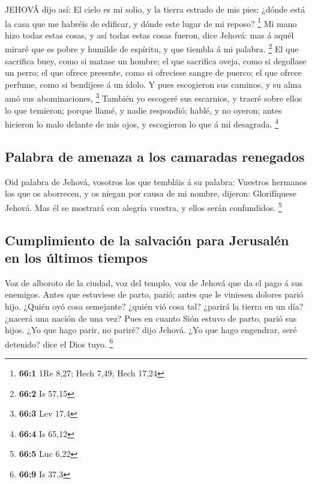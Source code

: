  JEHOVÁ dijo así: El cielo es mi solio, y la tierra estrado
de mis pies: ¿dónde está la casa que me habréis de edificar, y dónde
este lugar de mi reposo? \footnote{\textbf{66:1} 1Re 8,27; Hech 7,49;
  Hech 17,24}  Mi mano hizo todas estas cosas, y así todas
estas cosas fueron, dice Jehová: mas á aquél miraré que es pobre y
humilde de espíritu, y que tiembla á mi palabra. \footnote{\textbf{66:2}
  Is 57,15}  El que sacrifica buey, como si matase un
hombre; el que sacrifica oveja, como si degollase un perro; el que
ofrece presente, como si ofreciese sangre de puerco; el que ofrece
perfume, como si bendijese á un ídolo. Y pues escogieron sus caminos, y
su alma amó sus abominaciones, \footnote{\textbf{66:3} Lev 17,4}
 También yo escogeré sus escarnios, y traeré sobre ellos lo
que temieron; porque llamé, y nadie respondió; hablé, y no oyeron; antes
hicieron lo malo delante de mis ojos, y escogieron lo que á mí
desagrada. \footnote{\textbf{66:4} Is 65,12}

\hypertarget{palabra-de-amenaza-a-los-camaradas-renegados}{%
\subsection{Palabra de amenaza a los camaradas
renegados}\label{palabra-de-amenaza-a-los-camaradas-renegados}}

 Oid palabra de Jehová, vosotros los que tembláis á su
palabra: Vuestros hermanos los que os aborrecen, y os niegan por causa
de mi nombre, dijeron: Glorifíquese Jehová. Mas él se mostrará con
alegría vuestra, y ellos serán confundidos. \footnote{\textbf{66:5} Luc
  6,22}

\hypertarget{cumplimiento-de-la-salvaciuxf3n-para-jerusaluxe9n-en-los-uxfaltimos-tiempos}{%
\subsection{Cumplimiento de la salvación para Jerusalén en los últimos
tiempos}\label{cumplimiento-de-la-salvaciuxf3n-para-jerusaluxe9n-en-los-uxfaltimos-tiempos}}

 Voz de alboroto de la ciudad, voz del templo, voz de Jehová
que da el pago á sus enemigos.  Antes que estuviese de
parto, parió; antes que le viniesen dolores parió hijo. 
¿Quién oyó cosa semejante? ¿quién vió cosa tal? ¿parirá la tierra en un
día? ¿nacerá una nación de una vez? Pues en cuanto Sión estuvo de parto,
parió sus hijos.  ¿Yo que hago parir, no pariré? dijo
Jehová. ¿Yo que hago engendrar, seré detenido? dice el Dios tuyo.
\footnote{\textbf{66:9} Is 37,3}

